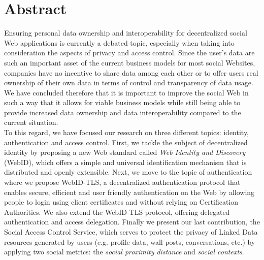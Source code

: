 \documentclass[a4paper]{book}
\begin{document}
\chapter*{Abstract}
\thispagestyle{empty}
\pagestyle{empty}
Ensuring personal data ownership and interoperability for decentralized social Web applications is currently a debated topic, especially when taking into consideration the aspects of privacy and access control. Since the user's data are such an important asset of the current business models for most social Websites, companies have no incentive to share data among each other or to offer users real ownership of their own data in terms of control and transparency of data usage. We have concluded therefore that it is important to improve the social Web in such a way that it allows for viable business models while still being able to provide increased data ownership and data interoperability compared to the current situation.\\

To this regard, we have focused our research on three different topics: identity, authentication and access control. First, we tackle the subject of decentralized identity by proposing a new Web standard called \textit{Web Identity and Discovery} (WebID), which offers a simple and universal identification mechanism that is distributed and openly extensible. Next, we move to the topic of authentication where we propose WebID-TLS, a decentralized authentication protocol that enables secure, efficient and user friendly authentication on the Web by allowing people to login using client certificates and without relying on Certification Authorities. We also extend the WebID-TLS protocol, offering delegated authentication and access delegation. Finally we present our last contribution, the Social Access Control Service, which serves to protect the privacy of Linked Data resources generated by users (e.g. profile data, wall posts, conversations, etc.) by applying two social metrics: the \textit{social proximity distance} and \textit{social contexts}.

\newpage
~
\newpage

\clearpage
{}
\tableofcontents

\pagestyle{fancy}




\listoffigures
\end{document}
